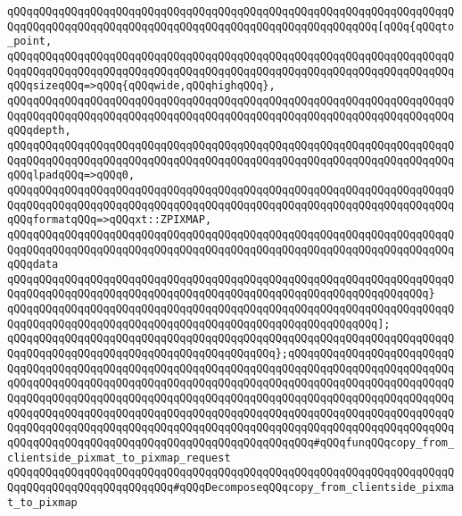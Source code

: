 \newline
\verb|qQQqqQQqqQQqqQQqqQQqqQQqqQQqqQQqqQQqqQQqqQQqqQQqqQQqqQQqqQQqqQQqqQQqqQQqqQQqqQQqqQQqqQQqqQQqqQQqqQQqqQQqqQQqqQQqqQQqqQQqqQQqqQQq[qQQq{qQQqto_point,|\newline
\verb|qQQqqQQqqQQqqQQqqQQqqQQqqQQqqQQqqQQqqQQqqQQqqQQqqQQqqQQqqQQqqQQqqQQqqQQqqQQqqQQqqQQqqQQqqQQqqQQqqQQqqQQqqQQqqQQqqQQqqQQqqQQqqQQqqQQqqQQqqQQqqQQqsizeqQQq=>qQQq{qQQqwide,qQQqhighqQQq},|\newline
\verb|qQQqqQQqqQQqqQQqqQQqqQQqqQQqqQQqqQQqqQQqqQQqqQQqqQQqqQQqqQQqqQQqqQQqqQQqqQQqqQQqqQQqqQQqqQQqqQQqqQQqqQQqqQQqqQQqqQQqqQQqqQQqqQQqqQQqqQQqqQQqqQQqdepth,|\newline
\verb|qQQqqQQqqQQqqQQqqQQqqQQqqQQqqQQqqQQqqQQqqQQqqQQqqQQqqQQqqQQqqQQqqQQqqQQqqQQqqQQqqQQqqQQqqQQqqQQqqQQqqQQqqQQqqQQqqQQqqQQqqQQqqQQqqQQqqQQqqQQqqQQqlpadqQQq=>qQQq0,|\newline
\verb|qQQqqQQqqQQqqQQqqQQqqQQqqQQqqQQqqQQqqQQqqQQqqQQqqQQqqQQqqQQqqQQqqQQqqQQqqQQqqQQqqQQqqQQqqQQqqQQqqQQqqQQqqQQqqQQqqQQqqQQqqQQqqQQqqQQqqQQqqQQqqQQqformatqQQq=>qQQqxt::ZPIXMAP,|\newline
\verb|qQQqqQQqqQQqqQQqqQQqqQQqqQQqqQQqqQQqqQQqqQQqqQQqqQQqqQQqqQQqqQQqqQQqqQQqqQQqqQQqqQQqqQQqqQQqqQQqqQQqqQQqqQQqqQQqqQQqqQQqqQQqqQQqqQQqqQQqqQQqqQQqdata|\newline
\verb|qQQqqQQqqQQqqQQqqQQqqQQqqQQqqQQqqQQqqQQqqQQqqQQqqQQqqQQqqQQqqQQqqQQqqQQqqQQqqQQqqQQqqQQqqQQqqQQqqQQqqQQqqQQqqQQqqQQqqQQqqQQqqQQqqQQqqQQq}|\newline
\verb|qQQqqQQqqQQqqQQqqQQqqQQqqQQqqQQqqQQqqQQqqQQqqQQqqQQqqQQqqQQqqQQqqQQqqQQqqQQqqQQqqQQqqQQqqQQqqQQqqQQqqQQqqQQqqQQqqQQqqQQqqQQqqQQq];|\newline
\verb|qQQqqQQqqQQqqQQqqQQqqQQqqQQqqQQqqQQqqQQqqQQqqQQqqQQqqQQqqQQqqQQqqQQqqQQqqQQqqQQqqQQqqQQqqQQqqQQqqQQqqQQqqQQqqQQq};qQQqqQQqqQQqqQQqqQQqqQQqqQQqqQQqqQQqqQQqqQQqqQQqqQQqqQQqqQQqqQQqqQQqqQQqqQQqqQQqqQQqqQQqqQQqqQQqqQQqqQQqqQQqqQQqqQQqqQQqqQQqqQQqqQQqqQQqqQQqqQQqqQQqqQQqqQQqqQQqqQQqqQQqqQQqqQQqqQQqqQQqqQQqqQQqqQQqqQQqqQQqqQQqqQQqqQQqqQQqqQQqqQQqqQQqqQQqqQQqqQQqqQQqqQQqqQQqqQQqqQQqqQQqqQQqqQQqqQQqqQQqqQQqqQQqqQQqqQQqqQQqqQQqqQQqqQQqqQQqqQQqqQQqqQQqqQQqqQQqqQQqqQQqqQQqqQQqqQQqqQQqqQQqqQQqqQQqqQQqqQQqqQQqqQQqqQQqqQQqqQQqqQQqqQQqqQQqqQQqqQQq#qQQqfunqQQqcopy_from_clientside_pixmat_to_pixmap_request|\newline
\newline
\verb|qQQqqQQqqQQqqQQqqQQqqQQqqQQqqQQqqQQqqQQqqQQqqQQqqQQqqQQqqQQqqQQqqQQqqQQqqQQqqQQqqQQqqQQqqQQqqQQq#qQQqDecomposeqQQqcopy_from_clientside_pixmat_to_pixmap|\newline
